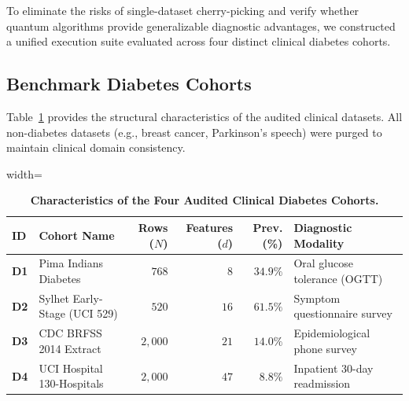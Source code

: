 \documentclass[journal,twocolumn]{IEEEtran}
\begin{document}
To eliminate the risks of single-dataset cherry-picking and verify whether quantum algorithms provide generalizable diagnostic advantages, we constructed a unified execution suite evaluated across four distinct clinical diabetes cohorts.

\subsection{Benchmark Diabetes Cohorts}
Table~\ref{tab:cohorts} provides the structural characteristics of the audited clinical datasets. All non-diabetes datasets (e.g., breast cancer, Parkinson's speech) were purged to maintain clinical domain consistency.

\begin{table}[htbp]
\centering\footnotesize
\caption{\textbf{Characteristics of the Four Audited Clinical Diabetes Cohorts.}}
\label{tab:cohorts}
\begin{adjustbox}{width=\columnwidth}
\begin{tabular}{llrrrl}
\toprule
\textbf{ID} & \textbf{Cohort Name} & \textbf{Rows ($N$)} & \textbf{Features ($d$)} & \textbf{Prev. (\%)} & \textbf{Diagnostic Modality} \\
\midrule
\textbf{D1} & Pima Indians Diabetes & $768$ & $8$ & $34.9\%$ & Oral glucose tolerance (OGTT) \\
\textbf{D2} & Sylhet Early-Stage (UCI 529) & $520$ & $16$ & $61.5\%$ & Symptom questionnaire survey \\
\textbf{D3} & CDC BRFSS 2014 Extract & $2{,}000$ & $21$ & $14.0\%$ & Epidemiological phone survey \\
\textbf{D4} & UCI Hospital 130-Hospitals & $2{,}000$ & $47$ & $8.8\%$ & Inpatient 30-day readmission \\
\bottomrule
\end{tabular}
\end{adjustbox}
\end{table}
\end{document}
